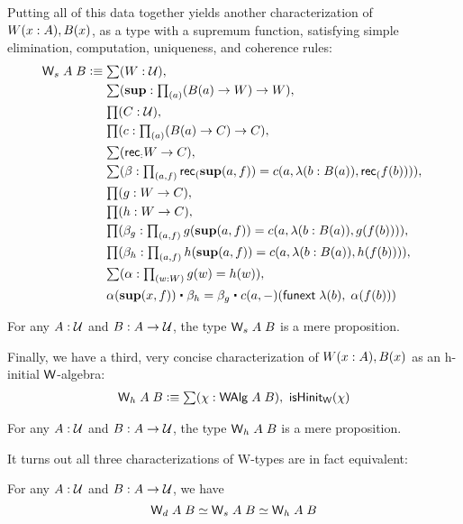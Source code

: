 Putting all of this data together yields another characterization of $W(x:A), B(x)$, as a type with a supremum function, satisfying simple elimination, computation, uniqueness, and coherence rules:
\begin{align*}
\w_s \; A \; B \defeq & \; \sm{W : \type} \\
                      & \; \sm{\supp : \prd {a} (B(a) \to W) \to W} \\
                      & \; \prd{C : \type} \\
                      & \; \prd{c : \prd{a} (B(a) \to C) \to C} \\
                      & \; \sm{\rec : W \to C} \\
                      & \; \sm{\beta : \prd{a,f} \rec(\supp(a,f)) = c(a,\lambda (b: B(a)), \rec(f(b)))} \\
                      & \; \prd{g : W \to C} \\
                      & \; \prd{h : W \to C} \\
                      & \; \prd{\beta_g : \prd{a,f} g(\supp(a,f)) = c(a,\lambda (b: B(a)), g(f(b)))} \\
                      & \; \prd{\beta_h : \prd{a,f} h(\supp(a,f)) = c(a,\lambda (b: B(a)), h(f(b)))} \\
                      & \; \sm{\alpha : \prd {w : W} g(w) = h(w)} \\
                      & \; \alpha(\supp(x,f)) \ct \beta_h = \beta_g \ct c(a,-)(\funext \; \lambda (b), \; \alpha(f(b)))
\end{align*}

\begin{thm}
For any $A : \mathcal{U}$ and $B : A \to \mathcal{U}$, the type $\mathsf{W}_s \; A \; B$ is a mere proposition.
\end{thm}

Finally, we have a third, very concise characterization of $W(x:A), B(x)$ as an h-initial $\mathsf{W}$-algebra:
\begin{align*}
\w_h \; A \; B \defeq \sm{\chi : \walg \; A \; B} \ishinitw(\chi)
\end{align*}

\begin{thm}
For any $A : \mathcal{U}$ and $B : A \to \mathcal{U}$, the type $\mathsf{W}_h \; A \; B$ is a mere proposition.
\end{thm}

It turns out all three characterizations of W-types are in fact equivalent:
\begin{thm}
For any $A : \mathcal{U}$ and $B : A \to \mathcal{U}$, we have
\[ \mathsf{W}_d \; A \; B \simeq \mathsf{W}_s \; A \; B \simeq \mathsf{W}_h \; A \; B \]
\end{thm}

